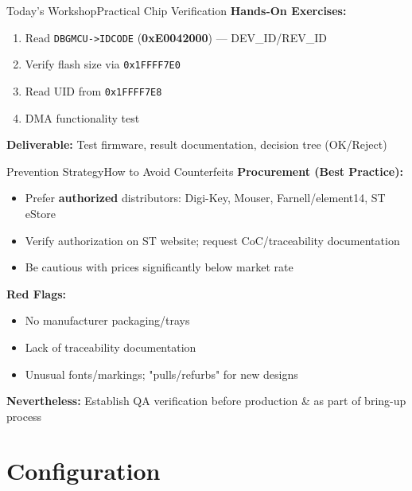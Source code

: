 \documentclass{beamer}
\begin{document}
\begin{frame}{Today's Workshop}{Practical Chip Verification}
	\textbf{Hands-On Exercises:}
	\begin{enumerate}
		\item Read \texttt{DBGMCU->IDCODE} (\textbf{0xE0042000}) — DEV\_ID/REV\_ID
		\item Verify flash size via \texttt{0x1FFFF7E0}
		\item Read UID from \texttt{0x1FFFF7E8}
		\item DMA functionality test
	\end{enumerate}
	
	\medskip
	\textbf{Deliverable:} Test firmware, result documentation, decision tree (OK/Reject)
\end{frame}

\begin{frame}{Prevention Strategy}{How to Avoid Counterfeits}
	\textbf{Procurement (Best Practice):}
	\begin{itemize}
		\item Prefer \textbf{authorized} distributors: Digi-Key, Mouser, Farnell/element14, ST eStore
		\item Verify authorization on ST website; request CoC/traceability documentation
		\item Be cautious with prices significantly below market rate
	\end{itemize}
	
	\medskip
	\textbf{Red Flags:}
	\begin{itemize}
		\item No manufacturer packaging/trays
		\item Lack of traceability documentation
		\item Unusual fonts/markings; "pulls/refurbs" for new designs
	\end{itemize}
	
	\medskip
	\textbf{Nevertheless:} Establish QA verification before production \& as part of bring-up process
\end{frame}
\section{Configuration}
\end{document}

